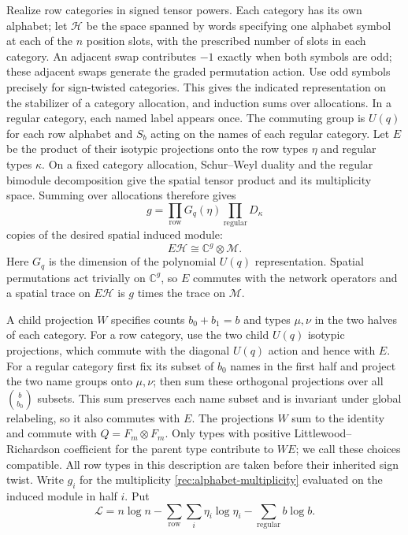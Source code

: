 Realize row categories in signed tensor powers.  Each category has its
own alphabet; let $\mathcal H$ be the space spanned by words specifying
one alphabet symbol at each of the $n$ position slots, with the prescribed
number of slots in each category.
An adjacent swap contributes $-1$ exactly when both symbols are odd;
these adjacent swaps generate the graded permutation action.  Use odd symbols precisely for sign-twisted categories.  This gives
the indicated representation on the stabilizer of a category allocation,
and induction sums over allocations.  In a regular category, each named
label appears once.  The commuting group is $U(q)$ for each row alphabet
and $S_b$ acting on the names of each regular category.  Let $E$ be
the product of their isotypic projections onto the row types $\eta$
and regular types $\kappa$.  On a fixed category allocation,
Schur--Weyl duality and the regular bimodule decomposition give the
spatial tensor product and its multiplicity space.  Summing over
allocations therefore gives
\begin{equation}\label{rec:alphabet-multiplicity}
 g=\prod_{\mathrm{row}}G_q(\eta)
                    \prod_{\mathrm{regular}}D_\kappa
\end{equation}
copies of the desired spatial induced module:
\[
 E\mathcal H\cong\mathbb C^g\otimes\mathcal M.
\]
Here $G_q$ is the dimension of the polynomial $U(q)$ representation.
Spatial permutations act trivially on $\mathbb C^g$, so $E$ commutes
with the network operators and a spatial trace on $E\mathcal H$ is
$g$ times the trace on $\mathcal M$.

A child projection $W$ specifies counts $b_0+b_1=b$ and types
$\mu,\nu$ in the two halves of each category.  For a row category,
use the two child $U(q)$ isotypic projections, which commute with
the diagonal $U(q)$ action and hence with $E$.  For a regular
category first fix its subset of $b_0$ names in the first half and
project the two name groups onto $\mu,\nu$; then sum these orthogonal
projections over all $\binom b{b_0}$ subsets.  This sum preserves each
name subset and is invariant under global relabeling, so it also
commutes with $E$.  The projections $W$ sum to the identity and
commute with $Q=F_m\otimes F_m$.  Only types with positive
Littlewood--Richardson coefficient for the parent type contribute
to $WE$; we call these choices compatible.  All row types in this
description are taken before their inherited sign twist.  Write $g_i$
for the multiplicity \eqref{rec:alphabet-multiplicity} evaluated on
the induced module in half $i$.
Put
\[
 \mathcal L=n\log n-
 \sum_{\mathrm{row}}\sum_i\eta_i\log\eta_i
 -\sum_{\mathrm{regular}}b\log b.
\]

